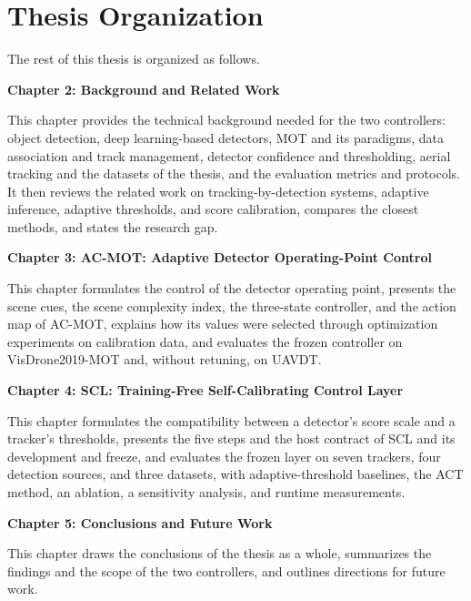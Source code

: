 \section{Thesis Organization}\label{sec:intro-organization}
The rest of this thesis is organized as follows.

\textbf{Chapter 2: Background and Related Work}

This chapter provides the technical background needed for the two controllers: object detection, deep learning-based detectors, MOT and its paradigms, data association and track management, detector confidence and thresholding, aerial tracking and the datasets of the thesis, and the evaluation metrics and protocols. It then reviews the related work on tracking-by-detection systems, adaptive inference, adaptive thresholds, and score calibration, compares the closest methods, and states the research gap.

\textbf{Chapter 3: AC-MOT: Adaptive Detector Operating-Point Control}

This chapter formulates the control of the detector operating point, presents the scene cues, the scene complexity index, the three-state controller, and the action map of AC-MOT, explains how its values were selected through optimization experiments on calibration data, and evaluates the frozen controller on VisDrone2019-MOT and, without retuning, on UAVDT.

\textbf{Chapter 4: SCL: Training-Free Self-Calibrating Control Layer}

This chapter formulates the compatibility between a detector's score scale and a tracker's thresholds, presents the five steps and the host contract of SCL and its development and freeze, and evaluates the frozen layer on seven trackers, four detection sources, and three datasets, with adaptive-threshold baselines, the ACT method, an ablation, a sensitivity analysis, and runtime measurements.

\textbf{Chapter 5: Conclusions and Future Work}

This chapter draws the conclusions of the thesis as a whole, summarizes the findings and the scope of the two controllers, and outlines directions for future work.
